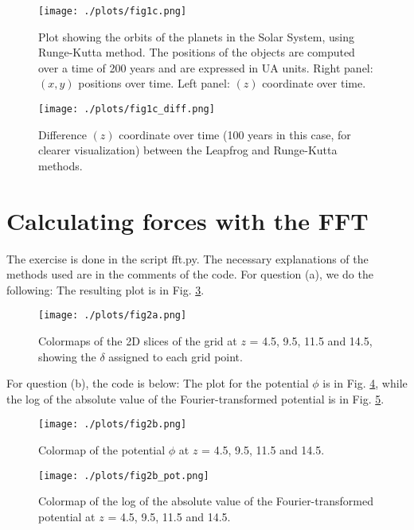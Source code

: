 \begin{figure}[h!]
    \centering
    \texttt{[image: ./plots/fig1c.png]}
    \caption{Plot showing the orbits of the planets in the Solar System, using Runge-Kutta method.
    The positions of the objects are computed over a time of 200 years and are expressed in UA units. Right panel: $(x,y)$ positions over time. Left panel: $(z)$ coordinate over time.} 
    \label{fig:fig1b}
  \end{figure}

  \begin{figure}[h!]
    \centering
    \texttt{[image: ./plots/fig1c\_diff.png]}
    \caption{Difference $(z)$ coordinate over time (100 years in this case, for clearer visualization) between the Leapfrog and Runge-Kutta methods.} 
    \label{fig:fig1bzoom}
  \end{figure}

\section{Calculating forces with the FFT}
The exercise is done in the script fft.py. The necessary explanations of the methods used are in the comments of the code.
For question (a), we do the following: 
The resulting plot is in Fig. \ref{fig:fig2a}.

\begin{figure}[h!]
  \centering
  \texttt{[image: ./plots/fig2a.png]}
  \caption{Colormaps of the 2D slices of the grid at $z$ = 4.5, 9.5, 11.5 and 14.5, showing the $\delta$ assigned to each grid point.} 
  \label{fig:fig2a}
\end{figure}

For question (b), the code is below: 
The plot for the potential $\phi$ is in Fig. \ref{fig:fig2b}, while the log of the absolute value of the Fourier-transformed potential is in Fig. \ref{fig:fig2blog}.

\begin{figure}[h!]
  \centering
  \texttt{[image: ./plots/fig2b.png]}
  \caption{Colormap of the potential $\phi$ at $z$ = 4.5, 9.5, 11.5 and 14.5.} 
  \label{fig:fig2b}
\end{figure}

\begin{figure}[h!]
  \centering
  \texttt{[image: ./plots/fig2b\_pot.png]}
  \caption{Colormap of the log of the absolute value of the Fourier-transformed potential at $z$ = 4.5, 9.5, 11.5 and 14.5.} 
  \label{fig:fig2blog}
\end{figure}

